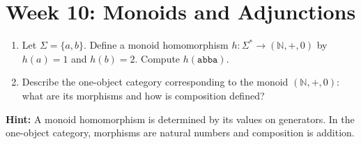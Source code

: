 \documentclass[11pt]{article}
\newcommand{\N}{\mathbb{N}}
\begin{document}
\section{Week 10: Monoids and Adjunctions}
\begin{enumerate}[label=(\alph*)]
  \item Let $\Sigma = \{a,b\}$. Define a monoid homomorphism $h: \Sigma^* \to (\N, +, 0)$ by $h(a)=1$ and $h(b)=2$. Compute $h(\texttt{abba})$.
  \item Describe the one-object category corresponding to the monoid $(\N, +, 0)$: what are its morphisms and how is composition defined?
\end{enumerate}
\textbf{Hint:} A monoid homomorphism is determined by its values on generators. In the one-object category, morphisms are natural numbers and composition is addition.
\end{document}
